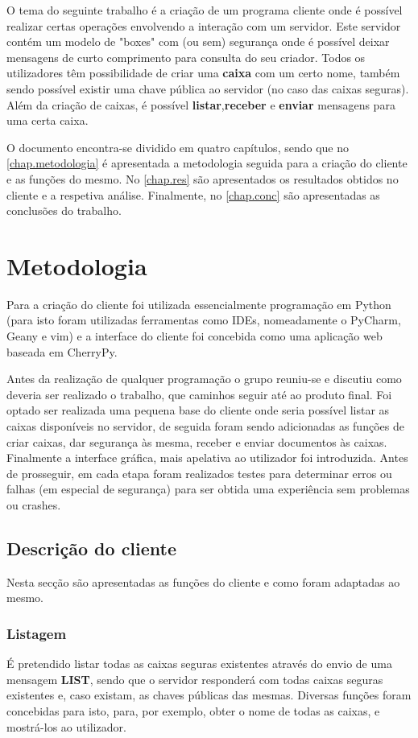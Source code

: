\documentclass{report}
\begin{document}
O tema do seguinte trabalho é a criação de um programa cliente onde é possível realizar certas operações envolvendo a interação com um servidor.
Este servidor contém um modelo de "boxes" com (ou sem) segurança onde é possível deixar mensagens de curto comprimento para consulta do seu criador. Todos os utilizadores têm possibilidade de criar uma \textbf{caixa} com um certo nome, também sendo possível existir uma chave pública ao servidor (no caso das caixas seguras). Além da criação de caixas, é possível \textbf{listar},\textbf{receber} e \textbf{enviar} mensagens para uma certa caixa.

O documento encontra-se dividido em quatro capítulos,
sendo que no \autoref{chap.metodologia} é apresentada a metodologia seguida para a criação do cliente e
as funções do mesmo.
No \autoref{chap.res} são apresentados os resultados obtidos no cliente e a respetiva análise.
Finalmente, no \autoref{chap.conc} são apresentadas
as conclusões do trabalho.

\chapter{Metodologia}
\label{chap.metodologia}

Para a criação do cliente foi utilizada essencialmente programação em Python (para isto foram utilizadas ferramentas como IDEs, nomeadamente o PyCharm, Geany e vim) e a interface do cliente foi concebida como uma aplicação web baseada em CherryPy.

Antes da realização de qualquer programação o grupo reuniu-se e discutiu como deveria ser realizado o trabalho, que caminhos seguir até ao produto final. Foi optado ser realizada uma pequena base do cliente onde seria possível listar as caixas disponíveis no servidor, de seguida foram sendo adicionadas as funções de criar caixas, dar segurança às mesma, receber e enviar documentos às caixas. Finalmente a interface gráfica, mais apelativa ao utilizador foi introduzida. Antes de prosseguir, em cada etapa foram realizados testes para determinar erros ou falhas (em especial de segurança) para ser obtida uma experiência sem problemas ou crashes. 

\section{Descrição do cliente}
\label{subs.desc}
Nesta secção são apresentadas as funções do cliente e como foram adaptadas ao mesmo.

\subsection{Listagem}
É pretendido listar todas as caixas seguras existentes através do envio de uma mensagem \textbf{LIST}, sendo que o servidor responderá com todas caixas seguras existentes e, caso existam, as chaves públicas das mesmas. Diversas funções foram concebidas para isto, para, por exemplo, obter o nome de todas as caixas, e mostrá-los ao utilizador.
\end{document}
